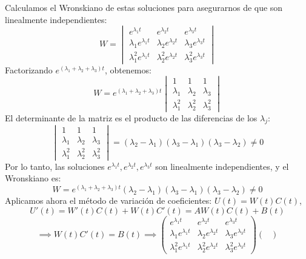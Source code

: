 {    Calculamos el Wronskiano de estas soluciones para asegurarnos de que son linealmente independientes:
    \[
        W =
        \begin{vmatrix}
            e^{\lambda_1 t} & e^{\lambda_2 t} & e^{\lambda_3 t} \\
            \lambda_1 e^{\lambda_1 t} & \lambda_2 e^{\lambda_2 t} & \lambda_3 e^{\lambda_3 t} \\
            \lambda_1^2 e^{\lambda_1 t} & \lambda_2^2 e^{\lambda_2 t} & \lambda_3^2 e^{\lambda_3 t}
        \end{vmatrix}
    \]
    Factorizando $e^{(\lambda_1 + \lambda_2 + \lambda_3) t}$, obtenemos:
    \[
        W = e^{(\lambda_1 + \lambda_2 + \lambda_3) t}
        \begin{vmatrix}
            1 & 1 & 1 \\
            \lambda_1 & \lambda_2 & \lambda_3 \\
            \lambda_1^2 & \lambda_2^2 & \lambda_3^2
        \end{vmatrix}
    \]
    El determinante de la matriz es el producto de las diferencias de los $\lambda_j$:
    \[
        \begin{vmatrix}
            1 & 1 & 1 \\
            \lambda_1 & \lambda_2 & \lambda_3 \\
            \lambda_1^2 & \lambda_2^2 & \lambda_3^2
        \end{vmatrix} = (\lambda_2 - \lambda_1)(\lambda_3 - \lambda_1)(\lambda_3 - \lambda_2) \neq 0
    \]
    Por lo tanto, las soluciones $e^{\lambda_1 t}, e^{\lambda_2 t}, e^{\lambda_3 t}$ son linealmente independientes, y el Wronskiano es:
    \[
        W = e^{(\lambda_1 + \lambda_2 + \lambda_3) t} (\lambda_2 - \lambda_1)(\lambda_3 - \lambda_1)(\lambda_3 - \lambda_2) \neq 0
    \]
    Aplicamos ahora el método de variación de coeficientes: $U(t) = W(t) C(t)$, 
    \[
        U'(t) = W'(t) C(t) + W(t) C'(t) = A W(t) C(t) + B(t)
    \]
    \[
        \implies W(t) C'(t) = B(t) \implies
        \begin{pmatrix}
            e^{\lambda_1 t} & e^{\lambda_2 t} & e^{\lambda_3 t} \\
            \lambda_1 e^{\lambda_1 t} & \lambda_2 e^{\lambda_2 t} & \lambda_3 e^{\lambda_3 t} \\
            \lambda_1^2 e^{\lambda_1 t} & \lambda_2^2 e^{\lambda_2 t} & \lambda_3^2 e^{\lambda_3 t}
        \end{pmatrix}
        \begin{pmatrix}

\end{pmatrix}\]}
